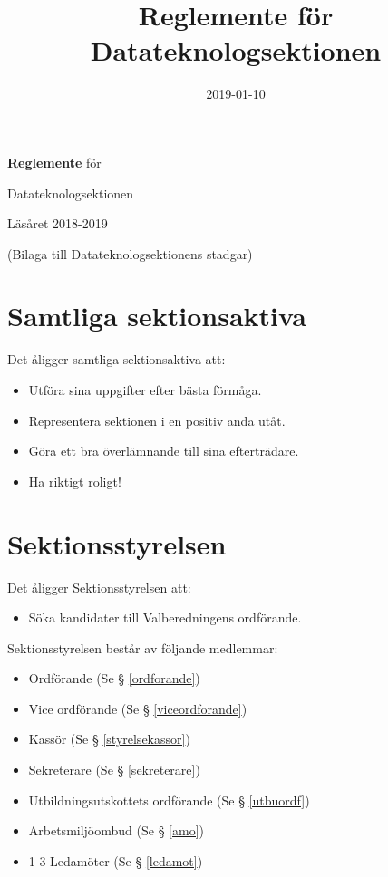 \documentclass{datateknologsektionen-document}
\title{Reglemente för Datateknologsektionen}
\date{2019-01-10}
\begin{document}
\hspace{0pt}
\vfill
\begin{center}

\Huge{
  \textbf{Reglemente} för
  
  Datateknologsektionen
  
  Läsåret 2018-2019
}

  \vspace{30pt}

\Large{(Bilaga till Datateknologsektionens stadgar)}
  
\end{center}
\vfill
\hspace{0pt}

\pagebreak

\tableofcontents

\pagebreak

\section{Samtliga sektionsaktiva}
Det åligger samtliga sektionsaktiva att:
\begin{itemize}
  \item Utföra sina uppgifter efter bästa förmåga.
  \item Representera sektionen i en positiv anda utåt.
  \item Göra ett bra överlämnande till sina efterträdare.
  \item Ha riktigt roligt!
\end{itemize}
\section{Sektionsstyrelsen}
Det åligger Sektionsstyrelsen att:
\begin{itemize}
  \item Söka kandidater till Valberedningens ordförande.
\end{itemize}
Sektionsstyrelsen består av följande medlemmar:
\begin{itemize}
  \item Ordförande (Se § \ref{ordforande})
  \item Vice ordförande (Se § \ref{viceordforande})
  \item Kassör (Se § \ref{styrelsekassor})
  \item Sekreterare (Se § \ref{sekreterare})
  \item Utbildningsutskottets ordförande (Se § \ref{utbuordf})
  \item Arbetsmiljöombud (Se § \ref{amo})
  \item 1-3 Ledamöter (Se § \ref{ledamot})
\end{itemize}
\end{document}

